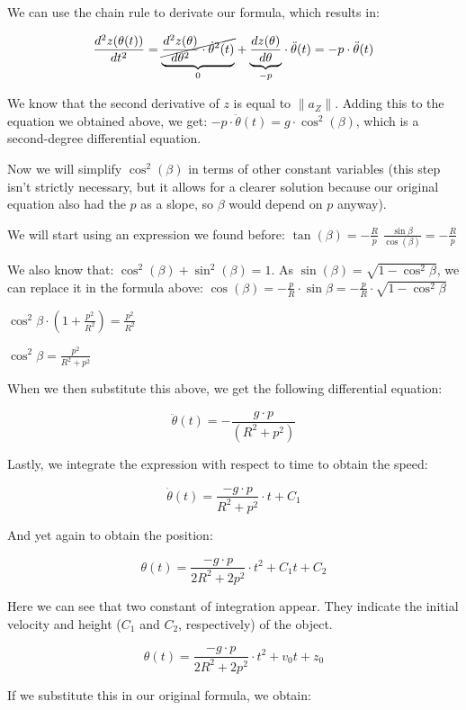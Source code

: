 \documentclass[12pt,twoside,a4paper]{article}
\newcommand{\ds}{\displaystyle}
\begin{document}
	We can use the chain rule to derivate our formula, which results in: 
	
	$$\ds \frac{d^2 z(\theta(t))}{dt^2} = \underset{0}{\underbrace{\cancel{\frac{d^2 z(\theta)}{d\theta^2} \cdot \dot\theta^2(t)}}} + \underset{-p}{\underbrace{\frac{dz(\theta)}{d\theta}}} \cdot \ddot\theta(t) = -p \cdot \ddot\theta(t)$$
	
	We know that the second derivative of $z$ is equal to $\|a_Z\|$. Adding this to the equation we obtained above, we get: $-p \cdot \ddot\theta(t) = g \cdot \cos^2(\beta)$, which is a second-degree differential equation.
	
	Now we will simplify $\cos^2(\beta)$ in terms of other constant variables (this step isn't strictly necessary, but it allows for a clearer solution because our original equation also had the $p$ as a slope, so $\beta$ would depend on $p$ anyway).
	
	We will start using an expression we found before: $\ds \tan(\beta) = - \frac{R}{p}$ $\ds \frac{\sin\beta}{\cos(\beta)} = - \frac{R}{p}$
	
	We also know that: $\cos^2(\beta) + \sin^2(\beta) = 1$. As $\sin(\beta) = \sqrt{1 - \cos^2\beta}$, we can replace it in the formula above: $\ds \cos(\beta) = - \frac{p}{R} \cdot \sin\beta = - \frac{p}{R} \cdot \sqrt{1 - \cos^2\beta}$
	
	$\ds \cos^2\beta \cdot \left(1 + \frac{p^2}{R^2}\right) = \frac{p^2}{R^2}$
	
	$\ds \cos^2\beta = \frac{p^2}{R^2 + p^2}$
	
	When we then substitute this above, we get the following differential equation: 
	
	$$\ds \ddot\theta(t) = - \frac{g \cdot p}{\left(R^2 + p^2 \right)}$$
	
	Lastly, we integrate the expression with respect to time to obtain the speed:
	
	$$\ds \dot\theta(t) = \frac{-g \cdot p}{R^2 + p^2} \cdot t + C_1$$
	
	And yet again to obtain the position:
	
	$$\ds \theta(t) = \frac{-g \cdot p}{2R^2 + 2p^2} \cdot t^2 + C_1t + C_2$$
	
	Here we can see that two constant of integration appear. They indicate the initial velocity and height ($C_1$ and $C_2$, respectively) of the object.
	
	$$\ds \boxed{\boxed{\theta(t) = \frac{-g \cdot p}{2R^2 + 2p^2} \cdot t^2 + v_0t + z_0}}$$
	
	If we substitute this in our original formula, we obtain:
	
\end{document}

